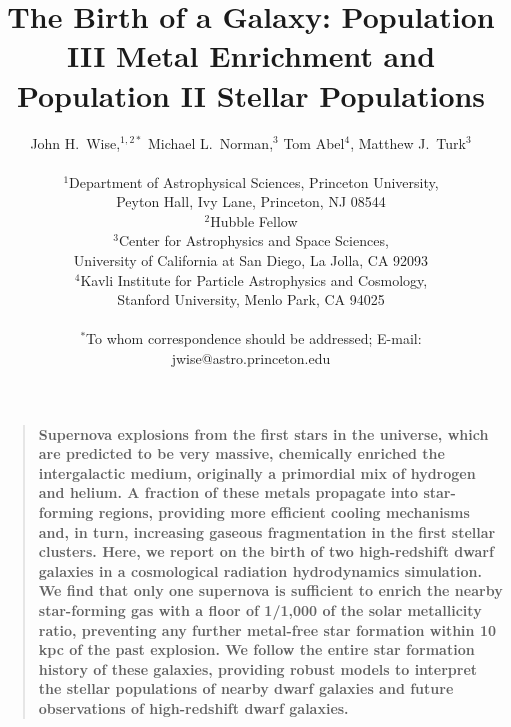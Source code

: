 \documentclass[12pt]{article}
\title{The Birth of a Galaxy: Population III Metal Enrichment and
  Population II Stellar Populations}
\author
{John H.~Wise,$^{1,2\ast}$ Michael L.~Norman,$^{3}$ Tom Abel$^{4}$,
Matthew J.~Turk$^{3}$\\
\\
\normalsize{$^{1}$Department of Astrophysical Sciences, Princeton
University,}\\
\normalsize{Peyton Hall, Ivy Lane, Princeton, NJ 08544}\\
\normalsize{$^{2}$Hubble Fellow}\\
\normalsize{$^{3}$Center for Astrophysics and Space Sciences,}\\
\normalsize{University of California at San Diego, La Jolla, CA 92093}\\
\normalsize{$^{4}$Kavli Institute for Particle Astrophysics and
  Cosmology, }\\
\normalsize{Stanford University, Menlo Park, CA 94025}\\
\\
\normalsize{$^\ast$To whom correspondence should be addressed; E-mail:
jwise@astro.princeton.edu}
}
\date{}
\newenvironment{sciabstract}{%
\begin{quote} \bf}
{\end{quote}}
\begin{document}
 


\baselineskip24pt


\maketitle 


\begin{sciabstract}
  Supernova explosions from the first stars in the universe, which are
  predicted to be very massive, chemically enriched the intergalactic
  medium, originally a primordial mix of hydrogen and helium.  A
  fraction of these metals propagate into star-forming regions,
  providing more efficient cooling mechanisms and, in turn, increasing
  gaseous fragmentation in the first stellar clusters.  Here, we
  report on the birth of two high-redshift dwarf galaxies in a
  cosmological radiation hydrodynamics simulation.  We find that only
  one supernova is sufficient to enrich the nearby star-forming gas
  with a floor of 1/1,000 of the solar metallicity ratio, preventing
  any further metal-free star formation within 10 kpc of the past
  explosion.  We follow the entire star formation history of these
  galaxies, providing robust models to interpret the stellar
  populations of nearby dwarf galaxies and future observations of
  high-redshift dwarf galaxies.
\end{sciabstract}

\end{document}
